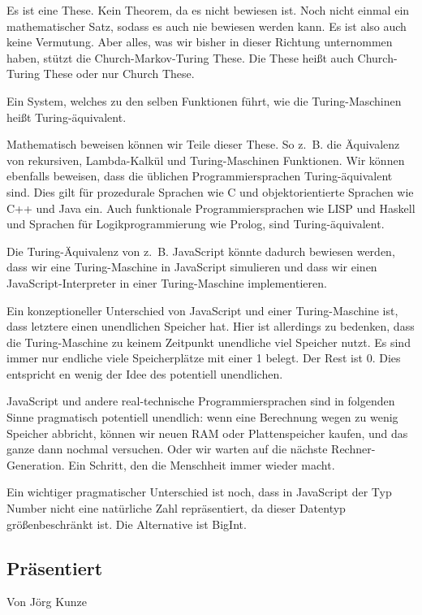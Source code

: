 \documentclass[a4paper]{amsart}
\theoremstyle{definition}
\begin{document}
Es ist eine These. Kein Theorem, da es nicht bewiesen ist. Noch nicht einmal ein mathematischer Satz, sodass es auch nie bewiesen werden kann. Es ist also auch keine Vermutung. Aber alles, was wir bisher in dieser Richtung unternommen haben, stützt die Church-Markov-Turing These. Die These heißt auch Church-Turing These oder nur Church These.

Ein System, welches zu den selben Funktionen führt, wie die Turing-Maschinen heißt Turing-äquivalent.

Mathematisch beweisen können wir Teile dieser These. So z.~B. die Äquivalenz von rekursiven, Lambda-Kalkül und Turing-Maschinen Funktionen. Wir können ebenfalls beweisen, dass die üblichen Programmiersprachen Turing-äquivalent sind. Dies gilt für prozedurale Sprachen wie C und objektorientierte Sprachen wie C++ und Java ein. Auch funktionale Programmiersprachen wie LISP und Haskell und Sprachen für Logikprogrammierung wie Prolog, sind Turing-äquivalent.

Die Turing-Äquivalenz von z.~B. JavaScript könnte dadurch bewiesen werden, dass wir eine Turing-Maschine in JavaScript simulieren und dass wir einen JavaScript-Interpreter in einer Turing-Maschine implementieren.

Ein konzeptioneller Unterschied von JavaScript und einer Turing-Maschine ist, dass letztere einen unendlichen Speicher hat. Hier ist allerdings zu bedenken, dass die Turing-Maschine zu keinem Zeitpunkt unendliche viel Speicher nutzt. Es sind immer nur endliche viele Speicherplätze mit einer 1 belegt. Der Rest ist 0. Dies entspricht en wenig der Idee des potentiell unendlichen.

JavaScript und andere real-technische Programmiersprachen sind in folgenden Sinne pragmatisch potentiell unendlich: wenn eine Berechnung wegen zu wenig Speicher abbricht, können wir neuen RAM oder Plattenspeicher kaufen, und das ganze dann nochmal versuchen. Oder wir warten auf die nächste Rechner-Generation. Ein Schritt, den die Menschheit immer wieder macht.

Ein wichtiger pragmatischer Unterschied ist noch, dass in JavaScript der Typ Number nicht eine natürliche Zahl repräsentiert, da dieser Datentyp größenbeschränkt ist. Die Alternative ist BigInt.


\subsection*{Präsentiert}
Von Jörg Kunze
\end{document}
